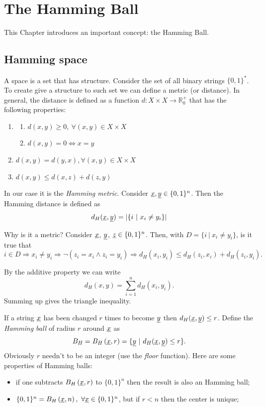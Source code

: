 \chapter{The Hamming Ball}

This Chapter introduces an important concept: the Hamming Ball.

\section{Hamming space}

A space is a set that has structure. Consider the set of all binary strings $\{0, 1\}^*$. To create give a structure to such set we can define a metric (or distance). In general, the distance is defined as a function $d: X \times X \rightarrow \mathbb{R}^+_0$ that has the following properties:
\begin{enumerate}
	\item \begin{enumerate}
		\item $d(x, y) \geq 0,\ \forall (x, y) \in X \times X$
		\item $d(x, y) = 0 \Leftrightarrow x = y$
	\end{enumerate}
	\item $d(x, y) = d(y, x), \forall (x, y) \in X \times X$
	\item $d(x, y) \leq d(x, z) + d(z, y)$
\end{enumerate}

In our case it is the \emph{Hamming metric}. Consider $\underline{x}, \underline{y}  \in \{0, 1\}^n$. Then the Hamming distance is defined as
\begin{equation}
	d_H(\underline{x}, \underline{y}) = |\{i\ |\ x_i \not= y_i\}|
\end{equation}

Why is it a metric? Consider $\underline{x}$, $\underline{y}$, $\underline{z} \in \{0,1\}^n$. Then, with $D = \{i\ |\ x_i \not= y_i\}$, is it true that 
\[
	i \in D \Rightarrow x_i \not=y_i \Rightarrow \neg (z_i = x_i \wedge z_i = y_i) \Rightarrow d_H(x_i, y_i) \leq d_H(z_i, x_i) + d_H(z_i, y_i).
\]

By the additive property we can write $$d_H(x, y) = \sum_{i = 1}^n d_H(x_i, y_i).$$ Summing up gives the triangle inequality.

If a string $\underline{x}$ has been changed $r$ times to become $\underline{y}$ then $d_H(\underline{x}, \underline{y}) \leq r$. Define the \emph{Hamming ball} of radius $r$ around $\underline{x}$ as 
\begin{equation}
B_H= B_H\left(\underline{x}, r\right) = \{\underline{y}\ |\ d_H(\underline{x}, \underline{y}) \leq r\}.
\end{equation}
Obviously $r$ needn't to be an integer (use the \emph{floor} function). Here are some properties of Hamming balls:
\begin{itemize}
	\item if one subtracts $B_H\left(\underline{x}, r\right)$ to $\{0, 1\}^n$ then the result is also an Hamming ball;
	\item $\{0, 1\}^n = B_H\left(\underline{x}, n\right),\ \forall \underline{x} \in \{0, 1\}^n$, but if $r < n$ then the center is unique;
\end{itemize}

